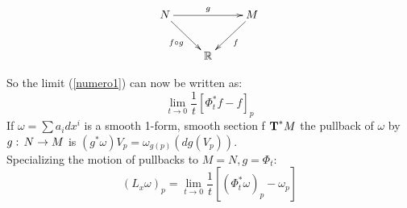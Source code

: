\begin{displaymath}
\xymatrix{%
    N \ar[rr]^-{g}\ar[rd]_{f\circ g} && M  \ar[ld]^f \\
   & \RRR  & }
\end{displaymath}

So the limit (\ref{numero1}) can now be written as:
$$\lim_{t\to 0} \frac{1}{t} \left[ \Phi_t^*f - f\right]_p$$
If $\omega= \sum a_i dx^i$ is a smooth 1-form, smooth section f $\text{\textbf{T}}^*M$ the pullback of $\omega$ by $g:\, N\to M$ is $(g^*\omega )V_p = \omega_{g(p)} (dg(V_p))$.\\
Specializing the motion of pullbacks to $M=N, g=\Phi_t$:
$$(L_x\omega )_p = \lim_{t\to 0} \frac{1}{t} \left[ (\Phi^*_t \omega)_p - \omega_p \right]$$
